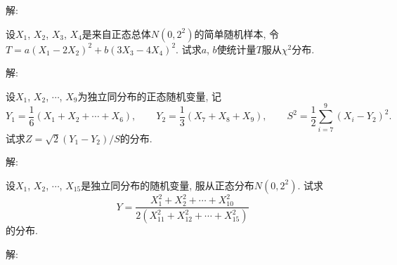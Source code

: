 \documentclass[standard]{ExBook}
\begin{document}
\begin{qitems}
    \begin{bbox}
解: 
    \end{bbox}

\vspace{-5em}

    \begin{bbox}
    \begin{shaded}
        \qitem
设$X_1$, $X_2$, $X_3$, $X_4$是来自正态总体$N(0,2^2)$的简单随机样本, 令$T=a(X_1-2X_2)^2+b(3X_3-4X_4)^2$. 试求$a$, $b$使统计量$T$服从$\chi^2$分布.
    \end{shaded}
    \end{bbox}

\vspace{-5em}

    \begin{bbox}
解: 
    \end{bbox}

\vspace{-5em}

    \begin{bbox}
    \begin{shaded}
        \qitem
设$X_1$, $X_2$, $\cdots$, $X_9$为独立同分布的正态随机变量, 记
$$Y_1 = \displaystyle\frac{1}{6}(X_1+X_2+\cdots+X_6), \qquad Y_2 = \frac{1}{3}(X_7+X_8+X_9), \qquad S^2=\frac{1}{2}\sum\limits_{i=7}^{9}(X_i-Y_2)^2.$$
试求$Z=\sqrt{2}(Y_1-Y_2) \big/ S$的分布.
    \end{shaded}
    \end{bbox}

\vspace{-5em}

    \begin{bbox}
解: 
    \end{bbox}

\vspace{-5em}

    \begin{bbox}
    \begin{shaded}
        \qitem
设$X_1$, $X_2$, $\cdots$, $X_{15}$是独立同分布的随机变量, 服从正态分布$N(0,2^2)$. 试求
$$Y = \displaystyle\frac{X_1^2+X_2^2+\cdots+X_{10}^2}{2\left(X_{11}^2+X_{12}^2+\cdots+X_{15}^2\right)}$$
的分布.
    \end{shaded}
    \end{bbox}

\vspace{-5em}

    \begin{bbox}
解: 
    \end{bbox}


\end{qitems}
\end{document}
